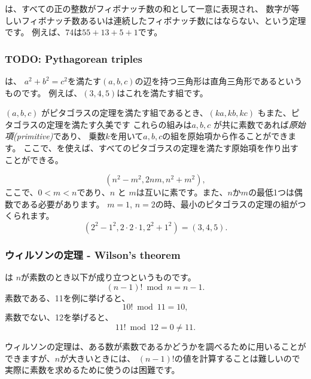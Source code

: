 
は、すべての正の整数がフィボナッチ数の和として一意に表現され、
数字が等しいフィボナッチ数あるいは連続したフィボナッチ数にはならない、という定理です。
例えば、74は$55+13+5+1$です。

\subsubsection{TODO: Pythagorean triples}


は、
$a^2+b^2=c^2$を満たす$(a,b,c)$の辺を持つ三角形は直角三角形であるというものです。
例えば、$(3,4,5)$はこれを満たす組です。

$(a, b, c)$ がピタゴラスの定理を満たす組であるとき、$(ka, kb, kc)$ もまた、ピタゴラスの定理を満たす久美です
これらの組みは$a, b, c$ が共に素数であれば\emph{原始項(primitive)}であり、
乗数$k$を用いて$a,b,c$の組を原始項から作ることができます。
ここで、を使えば、すべてのピタゴラスの定理を満たす原始項を作り出すことができる。

\[(n^2-m^2,2nm,n^2+m^2),\]
ここで、$0<m<n$であり、$n$ と $m$は互いに素です。また、$n$か$m$の最低1つは偶数である必要があります。
$m = 1$, $n = 2$の時、最小のピタゴラスの定理の組がつくられます。
\[(2^2-1^2,2\cdot2\cdot1,2^2+1^2)=(3,4,5).\]

\subsubsection{ウィルソンの定理 - Wilson's theorem}


は
$n$が素数のとき以下が成り立つというものです。
\[(n-1)! \bmod n = n-1.\]
素数である、11を例に挙げると、
\[10! \bmod 11 = 10,\]
素数でない、12を挙げると、
\[11! \bmod 12 = 0 \neq 11.\]

ウィルソンの定理は、ある数が素数であるかどうかを調べるために用いることができますが、$n$が大きいときには、
$(n - 1) !$の値を計算することは難しいので実際に素数を求めるために使うのは困難です。
